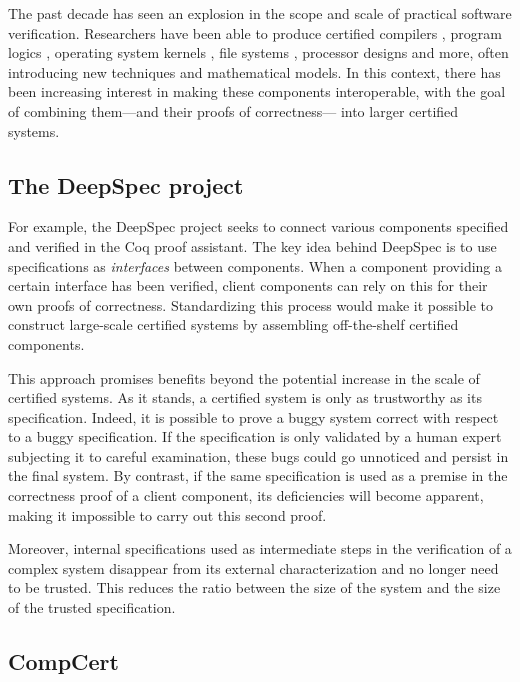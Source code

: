 \documentclass[11pt,oneside,draft]{book}
\theoremstyle{definition}
\begin{document}
The past decade has seen an explosion
in the scope and scale of practical software verification.
Researchers have been able to produce certified
compilers \citep{compcert},
program logics \citep{vst},
operating system kernels \citep{sel4,popl15},
file systems \citep{fscq},
processor designs \citep{safe,kami} and
more,
often introducing new techniques
and mathematical models.
In this context,
there has been increasing interest in
making these components
interoperable,
with the goal of
combining them---and their proofs of correctness---%
into larger certified systems.


\subsection{The DeepSpec project} %

For example, the DeepSpec project \citep{deepspec}
seeks to connect various components
specified and verified in the Coq proof assistant.
The key idea behind DeepSpec
is to use specifications as \emph{interfaces}
between components.
When a component providing a certain interface
has been verified,
client components can rely on this
for their own proofs of correctness.
Standardizing this process would make it possible
to construct large-scale certified systems
by assembling off-the-shelf certified components.

This approach promises benefits
beyond the potential increase in the scale of
certified systems.
As it stands,
a certified system is only
as trustworthy as its specification.
Indeed,
it is possible to prove a buggy system correct
with respect to a buggy specification.
If the specification is only validated by
a human expert subjecting it to careful examination,
these bugs could go unnoticed
and persist in the final system.
By contrast,
if the same specification is used as a premise
in the correctness proof of a client component,
its deficiencies will become apparent,
making it impossible to carry out this second proof.

Moreover,
internal specifications used
as intermediate steps
in the verification of a complex system
disappear from its external characterization
and no longer need to be trusted.
This reduces the ratio between the size of the system
and the size of the trusted specification.


\subsection{CompCert} %
\end{document}

